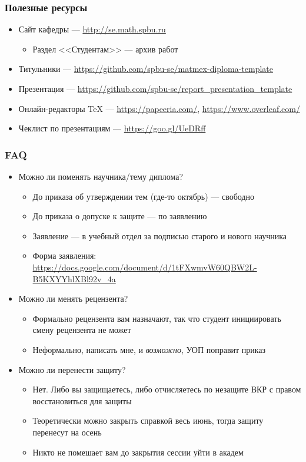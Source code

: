 \documentclass{../../slides-style}
\begin{document}
    \begin{frame}
        \frametitle{Полезные ресурсы}
        \begin{itemize}
            \item Сайт кафедры --- \url{http://se.math.spbu.ru}
            \begin{itemize}
                \item Раздел <<Студентам>> --- архив работ
            \end{itemize}
            \item Титульники --- \url{https://github.com/spbu-se/matmex-diploma-template}
            \item Презентация --- \url{https://github.com/spbu-se/report_presentation_template}
            \item Онлайн-редакторы TeX --- \url{https://papeeria.com/}, \url{https://www.overleaf.com/}
            \item Чеклист по презентациям --- \url{https://goo.gl/UeDRff}
        \end{itemize}
    \end{frame}

    \begin{frame}
        \frametitle{FAQ}
        \begin{itemize}
            \item Можно ли поменять научника/тему диплома?
            \begin{itemize}
                \item До приказа об утверждении тем (где-то октябрь) --- свободно
                \item До приказа о допуске к защите --- по заявлению 
                \item Заявление --- в учебный отдел за подписью старого и нового научника 
                \item Форма заявления: \url{https://docs.google.com/document/d/1tFXwmvW60QBW2L-B5KXYYhlXBl92v_4a}
            \end{itemize}
            \item Можно ли менять рецензента?
            \begin{itemize}
                \item Формально рецензента вам назначают, так что студент инициировать смену рецензента не может
                \item Неформально, написать мне, и \textit{возможно}, УОП поправит приказ
            \end{itemize}
            \item Можно ли перенести защиту?
            \begin{itemize}
                \item Нет. Либо вы защищаетесь, либо отчисляетесь по незащите ВКР с правом восстановиться для защиты
                \item Теоретически можно закрыть справкой весь июнь, тогда защиту перенесут на осень
                \item Никто не помешает вам до закрытия сессии уйти в академ
            \end{itemize}
        \end{itemize}
    \end{frame}
\end{document}
